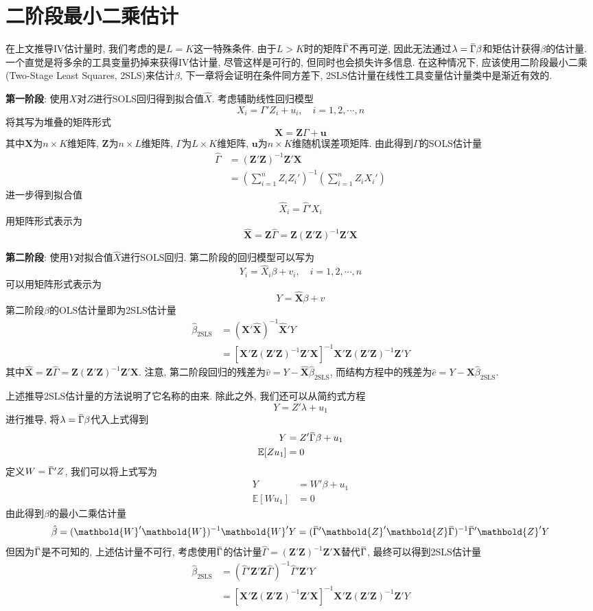 \documentclass[cn, 12pt, math=mtpro2, bibstyle=apa, blue, twocol]{elegantbook}
\newcommand{\E}{\mathbb{E}}
\newcommand{\X}{\mathbold{X}}
\newcommand{\Z}{\mathbold{Z}}
\newcommand{\hb}{\hat{\beta}}
\newcommand{\overbar}[1]{\mkern 1.5mu\overline{\mkern-1.5mu#1\mkern-1.5mu}\mkern 1.5mu}
\begin{document}
\section{二阶段最小二乘估计}

在上文推导IV估计量时, 我们考虑的是$L=K$这一特殊条件. 由于$L>K$时的矩阵$\overbar{\Gamma}$不再可逆, 因此无法通过$\lambda=\overbar{\Gamma}\beta$和矩估计获得$\beta$的估计量. 一个直觉是将多余的工具变量扔掉来获得IV估计量, 尽管这样是可行的, 但同时也会损失许多信息. 在这种情况下, 应该使用二阶段最小二乘(Two-Stage Least Squares, 2SLS)来估计$\beta$, 下一章将会证明在条件同方差下, 2SLS估计量在线性工具变量估计量类中是渐近有效的.

\textbf{第一阶段}: 使用$X$对$Z$进行SOLS回归得到拟合值$\hat{X}$. 考虑辅助线性回归模型
$$X_i=\Gamma'Z_i+u_i,\quad i=1,2,\cdots,n$$
将其写为堆叠的矩阵形式
$$\X=\Z\Gamma+\mathbold{u}$$
其中$\X$为$n\times K$维矩阵, $\Z$为$n\times L$维矩阵, $\Gamma$为$L\times K$维矩阵, $\mathbold{u}$为$n\times K$维随机误差项矩阵. 由此得到$\Gamma$的SOLS估计量
\begin{align*}
\hat{\Gamma}&=(\Z'\Z)^{-1}\Z'\X \\
&=\left(\sum_{i=1}^{n}Z_iZ_i'\right)^{-1}\left(\sum_{i=1}^{n}Z_iX_i'\right)
\end{align*}
进一步得到拟合值
$$\hat{X}_i=\hat{\Gamma}'X_i$$
用矩阵形式表示为
$$\hat{\X}=\Z\hat{\Gamma}=\Z(\Z'\Z)^{-1}\Z'\X$$

\textbf{第二阶段}: 使用$Y$对拟合值$\hat{X}$进行SOLS回归. 第二阶段的回归模型可以写为
$$Y_i=\hat{X}_i\beta+v_i,\quad i=1,2,\cdots,n$$
可以用矩阵形式表示为
$$Y=\hat{\X}\beta+v$$
第二阶段$\beta$的OLS估计量即为2SLS估计量
\begin{align*}
\hb_{\text{2SLS}}&=(\hat{\X}'\hat{\X})^{-1}\hat{\X}'Y \\
&=[\X'\Z(\Z'\Z)^{-1}\Z'\X]^{-1}\X'\Z(\Z'\Z)^{-1}\Z'Y
\end{align*}
其中$\hat{\X}=\Z\hat{\Gamma}=\Z(\Z'\Z)^{-1}\Z'\X$. 注意, 第二阶段回归的残差为$\hat{v}=Y-\hat{\X}\hb_{\text{2SLS}}$, 而结构方程中的残差为$\hat{e}=Y-\X\hb_{\text{2SLS}}$.

上述推导2SLS估计量的方法说明了它名称的由来. 除此之外, 我们还可以从简约式方程
$$Y=Z'\lambda+u_1$$
进行推导, 将$\lambda=\overbar{\Gamma}\beta$代入上式得到
\begin{align*}
Y&=Z'\overbar{\Gamma}\beta+u_1 \\
\E[Zu_1]&=0
\end{align*}
定义$W=\overbar{\Gamma}'Z$, 我们可以将上式写为
\begin{align*}
Y&=W'\beta+u_1 \\
\E[Wu_1]&=0
\end{align*}
由此得到$\beta$的最小二乘估计量
$$\hb=(\mathbold{W}'\mathbold{W})^{-1}\mathbold{W}'Y=(\overbar{\Gamma}'\Z'\Z\overbar{\Gamma})^{-1}\overbar{\Gamma}'\Z' Y$$
但因为$\overbar{\Gamma}$是不可知的, 上述估计量不可行, 考虑使用$\overbar{\Gamma}$的估计量$\hat{\Gamma}=(\Z'\Z)^{-1}\Z'\X$替代$\overbar{\Gamma}$, 最终可以得到2SLS估计量
\begin{align*}
\hb_{\text{2SLS}}&=(\hat{\Gamma}'\Z'\Z\hat{\Gamma})^{-1}\hat{\Gamma}'\Z'Y\\
&=[\X'\Z(\Z'\Z)^{-1}\Z'\X]^{-1}\X'\Z(\Z'\Z)^{-1}\Z'Y
\end{align*}
\end{document}
